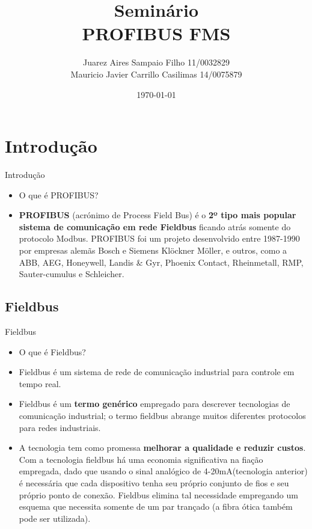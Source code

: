 \documentclass{beamer}
\title[UnB - Elementos de Automação - 1º/2014]{Seminário \\ PROFIBUS FMS}
\author[Mauricio Carrillo e Juarez Sampaio]{Juarez Aires Sampaio Filho 11/0032829 \\
Mauricio Javier Carrillo Casilimas 14/0075879 }
\institute{Universidade de Brasília}
\date{\today}
\begin{document}
\begin{frame}
        \titlepage
\end{frame}

\AtBeginSection[]
{
}

\section{Introdução}

\begin{frame}{Introdução}
\begin{itemize}
\pause \item O que é PROFIBUS?
\pause \item \textbf{PROFIBUS} (acrónimo de Process Field Bus) é o \textbf{2º tipo mais popular sistema de comunicação em rede Fieldbus} ficando atrás somente do protocolo Modbus. PROFIBUS foi um projeto desenvolvido entre 1987-1990 por empresas alemãs Bosch e Siemens Klöckner Möller, e outros, como a ABB, AEG, Honeywell, Landis \& Gyr, Phoenix Contact, Rheinmetall, RMP, Sauter-cumulus e Schleicher.
\end{itemize}
\end{frame}

\subsection{Fieldbus}
\begin{frame}{Fieldbus}
\begin{itemize}
\item O que é Fieldbus?
\pause \item Fieldbus é um sistema de rede de comunicação industrial para controle em tempo real.
\pause \item Fieldbus é um \textbf{termo genérico} empregado para descrever tecnologias de comunicação industrial; o termo fieldbus abrange muitos diferentes protocolos para redes industriais.
\pause \item A tecnologia tem como promessa \textbf{melhorar a qualidade e reduzir custos}. Com a tecnologia fieldbus há uma economia significativa na fiação empregada, dado que usando o sinal analógico de 4-20mA(tecnologia anterior) é necessária que cada dispositivo tenha seu próprio conjunto de fios e seu próprio ponto de conexão. Fieldbus elimina tal necessidade empregando um esquema que necessita somente de um par trançado (a fibra ótica também pode ser utilizada).
\end{itemize}
\end{frame}
\end{document}
